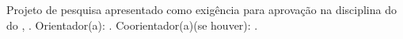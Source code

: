 \begin{titlepage}
    \centering
    \MakeUppercase{\aluno\\}
    
    \vspace{4cm}
    
    \textbf{\MakeUppercase{\titulo}}\\
    
    \vspace{3cm}
    
    \begin{flushright}
        \begin{minipage}{8cm}
            \singlespacing
            Projeto de pesquisa apresentado como exigência para aprovação na disciplina \disciplina do \curso  do \instituicao, \campus. Orientador(a): \orientador. Coorientador(a)(se houver): \coorientador.
        \end{minipage}
    \end{flushright}
    
    \vfill
    
    \local\\
    \ano
\end{titlepage}